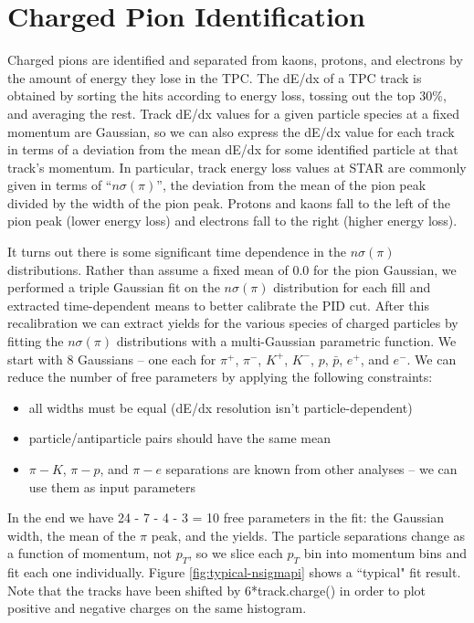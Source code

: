 \section{Charged Pion Identification}

Charged pions are identified and separated from kaons, protons, and electrons by the amount of energy they lose in the TPC.  The dE/dx of a TPC track is obtained by sorting the hits according to energy loss, tossing out the top 30\%, and averaging the rest.  Track dE/dx values for a given particle species at a fixed momentum are Gaussian, so we can also express the dE/dx value for each track in terms of a deviation from the mean dE/dx for some identified particle at that track's momentum.  In particular, track energy loss values at STAR are commonly given in terms of ``$n\sigma(\pi)$'', the deviation from the mean of the pion peak divided by the width of the pion peak.  Protons and kaons fall to the left of the pion peak (lower energy loss) and electrons fall to the right (higher energy loss).

It turns out there is some significant time dependence in the $n\sigma(\pi)$ distributions.  Rather than assume a fixed mean of 0.0 for the pion Gaussian,  we performed a triple Gaussian fit on the $n\sigma(\pi)$ distribution for each fill and extracted time-dependent means to better calibrate the PID cut.  After this recalibration we can extract yields for the various species of charged particles by fitting the $n\sigma(\pi)$ distributions with a multi-Gaussian parametric function.  We start with 8 Gaussians -- one each for $\pi^{+}$, $\pi^{-}$, $K^{+}$, $K^{-}$, $p$, $\bar{p}$, $e^{+}$, and $e^{-}$.  We can reduce the number of free parameters by applying the following constraints:

\begin{itemize}
    \item all widths must be equal (dE/dx resolution isn't particle-dependent)
    \item particle/antiparticle pairs should have the same mean
    \item $\pi - K$, $\pi - p$, and $\pi - e$ separations are known from other analyses -- we can use them as input parameters
\end{itemize}

In the end we have 24 - 7 - 4 - 3 = 10 free parameters in the fit:  the Gaussian width, the mean of the $\pi$ peak, and the yields.  The particle separations change as a function of momentum, not $p_{T}$, so we slice each $p_{T}$ bin into momentum bins and fit each one individually.  Figure \ref{fig:typical-nsigmapi} shows a ``typical" fit result.  Note that the tracks have been shifted by 6*track.charge() in order to plot positive and negative charges on the same histogram.

